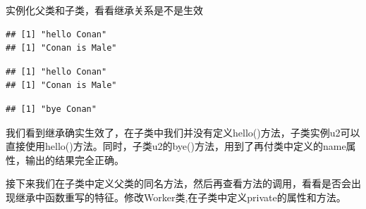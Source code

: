 \documentclass[]{book}
\newenvironment{Shaded}{\begin{snugshade}}{\end{snugshade}}
\newcommand{\KeywordTok}[1]{\textcolor[rgb]{0.13,0.29,0.53}{\textbf{#1}}}
\newcommand{\StringTok}[1]{\textcolor[rgb]{0.31,0.60,0.02}{#1}}
\newcommand{\CommentTok}[1]{\textcolor[rgb]{0.56,0.35,0.01}{\textit{#1}}}
\newcommand{\OperatorTok}[1]{\textcolor[rgb]{0.81,0.36,0.00}{\textbf{#1}}}
\newcommand{\NormalTok}[1]{#1}
\begin{document}
实例化父类和子类，看看继承关系是不是生效

\begin{Shaded}
\end{Shaded}

\begin{verbatim}
## [1] "hello Conan"
## [1] "Conan is Male"
\end{verbatim}

\begin{Shaded}
\end{Shaded}

\begin{verbatim}
## [1] "hello Conan"
## [1] "Conan is Male"
\end{verbatim}

\begin{Shaded}
\end{Shaded}

\begin{verbatim}
## [1] "bye Conan"
\end{verbatim}

我们看到继承确实生效了，在子类中我们并没有定义hello()方法，子类实例u2可以直接使用hello()方法。同时，子类u2的bye()方法，用到了再付类中定义的name属性，输出的结果完全正确。

接下来我们在子类中定义父类的同名方法，然后再查看方法的调用，看看是否会出现继承中函数重写的特征。修改Worker类,在子类中定义private的属性和方法。
\end{document}
